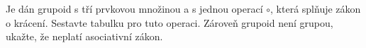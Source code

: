 \subsubsection{}
Je dán grupoid s tří prvkovou množinou a s jednou operací $\circ$, která splňuje
zákon o krácení. Sestavte tabulku pro tuto operaci. Zároveň grupoid není grupou,
ukažte, že neplatí asociativní zákon.
